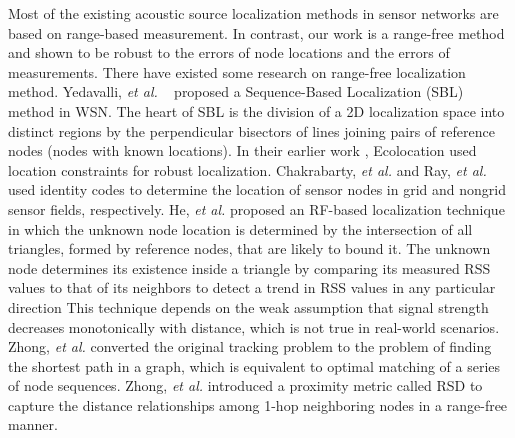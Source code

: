 Most of the existing acoustic source localization methods in sensor networks are based on range-based measurement.
In contrast, our work is a range-free method and shown to be robust to the errors of node locations and the errors of measurements.
There have existed some research on range-free localization method.
Yedavalli, \emph{et al.} ~\cite{yedavalli2008sequence} proposed a Sequence-Based Localization (SBL) method in WSN. 
The heart of SBL is the division of a 2D localization space into distinct regions by the perpendicular bisectors of lines joining pairs of reference nodes (nodes with known locations).
In their earlier work \cite{yedavalli2005ecolocation}, Ecolocation used location constraints for robust localization.
Chakrabarty, \emph{et al.} \cite{chakrabarty2002grid} and Ray, \emph{et al.} \cite{ray2004robust} used identity codes to determine the location of sensor nodes in grid and nongrid sensor fields, respectively. 
He, \emph{et al.} \cite{he2003range} proposed an RF-based localization technique in which the unknown node location is determined by the intersection of all triangles,
formed by reference nodes, that are likely to bound it. The unknown node determines its existence inside a triangle by
comparing its measured RSS values to that of its neighbors to detect a trend in RSS values in any particular direction
This technique depends on the weak assumption that signal strength decreases monotonically with distance, which is not true in real-world scenarios.
Zhong, \emph{et al.} \cite{zhong2009tracking} converted the original tracking problem to the problem of finding the shortest path in a graph, which is equivalent to optimal matching of a series of node sequences. 
Zhong, \emph{et al.} \cite{zhong2011rsd} introduced a proximity metric called RSD to capture the distance relationships among 1-hop neighboring nodes in a range-free manner. 
